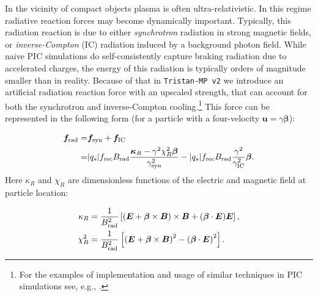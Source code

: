 In the vicinity of compact objects plasma is often ultra-relativistic. In this regime radiative reaction forces may become dynamically important. Typically, this radiation reaction is due to either \emph{synchrotron} radiation in strong magnetic fields, or \emph{inverse-Compton} (IC) radiation induced by a background photon field. While naive PIC simulations do self-consistently capture braking radiation due to accelerated charges, the energy of this radiation is typically orders of magnitude smaller than in reality. Because of that in \texttt{Tristan-MP v2} we introduce an artificial radiation reaction force with an upscaled strength, that can account for both the synchrotron and inverse-Compton cooling.\footnote{For the examples of implementation and usage of similar techniques in PIC simulations see, e.g., \cite{2010NJPh...12l3005T, 2016CoPhC.204..141V, 2016ApJ...828...92Y, 2019ApJ...877...53H, 2019MNRAS.482L..60W, 2020arXiv201203043N}.} This force can be represented in the following form (for a particle with a four-velocity $\bm{u}=\gamma\bm{\beta}$):

\begin{equation}
\begin{split}
\label{eq:num-radiation}
    \bm{f}_{\rm rad} =& \bm{f}_{\rm syn} + \bm{f}_{\rm IC}\\
    =&|q_s| f_{\rm rec} B_{\rm rad}\frac{\bm{\kappa}_R - \gamma^2\chi_R^2 \bm{\beta}}{\gamma_{\rm syn}^2}-|q_s| f_{\rm rec} B_{\rm rad}\frac{\gamma^2}{\gamma_{\rm IC}^2}\bm{\beta}.
\end{split}
\end{equation}
\noindent Here $\kappa_R$ and $\chi_R$ are dimensionless functions of the electric and magnetic field at particle location:

\begin{equation}
    \begin{aligned}
    \label{eq:num-kappa-chi}
        \kappa_R &= \frac{1}{B_{\rm rad}^2}\left[\left(\bm{E} + \bm{\beta}\times\bm{B}\right)\times\bm{B} + (\bm{\beta}\cdot\bm{E})\bm{E}\right],\\
        \chi_R^2 &= \frac{1}{B_{\rm rad}^2}\left[\left(\bm{E} + \bm{\beta}\times\bm{B}\right)^2 - \left(\bm{\beta}\cdot\bm{E}\right)^2\right].
    \end{aligned}
\end{equation}

